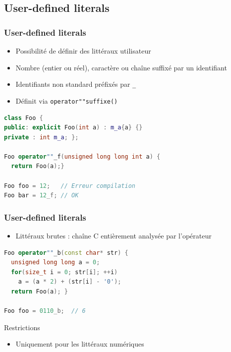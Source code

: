 \documentclass[C++.tex]{subfiles}
\begin{document}
\subsection*{User-defined literals}
\begin{frame}[fragile]
	\frametitle{User-defined literals}
	\begin{itemize}
		\item Possibilité de définir des littéraux \og utilisateur\fg{}
		\item Nombre (entier ou réel), caractère ou chaîne suffixé par un identifiant
		\item Identifiants non standard préfixés par \lstinline|_|


		\item Définit via \lstinline|operator""suffixe()|
	\end{itemize}

	\begin{lstlisting}[language=C++]
class Foo {
public: explicit Foo(int a) : m_a{a} {}
private : int m_a; };

Foo operator""_f(unsigned long long int a) {
  return Foo(a);}

Foo foo = 12;   // Erreur compilation
Foo bar = 12_f; // OK\end{lstlisting}

\end{frame}

\begin{frame}[fragile]
	\frametitle{User-defined literals}
	\begin{itemize}
		\item Littéraux brutes : chaîne C entièrement analysée par l'opérateur
	\end{itemize}
	
\begin{lstlisting}[language=C++]
Foo operator""_b(const char* str) {
  unsigned long long a = 0;
  for(size_t i = 0; str[i]; ++i)
    a = (a * 2) + (str[i] - '0');
  return Foo(a); }
		
Foo foo = 0110_b;  // 6\end{lstlisting}

	\begin{alertblock}{Restrictions}
		\begin{itemize}
			\item Uniquement pour les littéraux numériques
		\end{itemize}
	\end{alertblock}
\end{frame}
\end{document}
